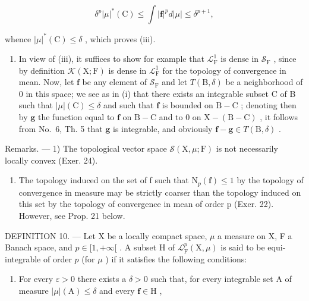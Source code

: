 \[
\delta^ {p} | \mu | ^ {*} (\mathrm{C}) \leqslant \int | \mathbf {f} | ^ {p} d | \mu | \leqslant \delta^ {p + 1},
\]

whence \(|\mu|^*(\mathrm{C}) \leqslant \delta\) , which proves (iii).

\begin{enumerate}
\def\labelenumi{(\roman{enumi})}
\setcounter{enumi}{1}
\tightlist
\item
  In view of (iii), it suffices to show for example that \(\mathcal{L}_{\mathrm{F}}^{1}\) is dense in \(\mathcal{S}_{\mathrm{F}}\) , since by definition \(\mathcal{K}(\mathrm{X};\mathrm{F})\) is dense in \(\mathcal{L}_{\mathrm{F}}^{1}\) for the topology of convergence in mean. Now, let \(\mathbf{f}\) be any element of \(\mathcal{S}_{\mathrm{F}}\) and let \(T(\mathrm{B},\delta)\) be a neighborhood of 0 in this space; we see as in (i) that there exists an integrable subset C of B such that \(|\mu|(\mathrm{C})\leqslant \delta\) and such that \(\mathbf{f}\) is bounded on \(\mathrm{B - C}\) ; denoting then by \(\mathbf{g}\) the function equal to \(\mathbf{f}\) on \(\mathrm{B - C}\) and to 0 on \(\mathrm{X - (B - C)}\) , it follows from No.~6, Th. 5 that \(\mathbf{g}\) is integrable, and obviously \(\mathbf{f} - \mathbf{g}\in T(\mathrm{B},\delta)\) .
\end{enumerate}

Remarks. --- 1) The topological vector space \(\mathcal{S}(\mathrm{X},\mu ;\mathrm{F})\) is not necessarily locally convex (Exer. 24).

\begin{enumerate}
\def\labelenumi{\arabic{enumi})}
\setcounter{enumi}{1}
\tightlist
\item
  The topology induced on the set of f such that \(\mathrm{N}_{p}(\mathbf{f}) \leqslant 1\) by the topology of convergence in measure may be strictly coarser than the topology induced on this set by the topology of convergence in mean of order p (Exer. 22). However, see Prop. 21 below.
\end{enumerate}

DEFINITION 10. --- Let X be a locally compact space, \(\mu\) a measure on X, F a Banach space, and \(p \in [1, +\infty[\) . A subset H of \(\mathcal{L}_{\mathrm{F}}^{p}(\mathrm{X}, \mu)\) is said to be equi-integrable of order \(p\) (for \(\mu\) ) if it satisfies the following conditions:

\begin{enumerate}
\def\labelenumi{(\roman{enumi})}
\tightlist
\item
  For every \(\varepsilon > 0\) there exists a \(\delta > 0\) such that, for every integrable set A of measure \(|\mu| (\mathrm{A}) \leqslant \delta\) and every \(\mathbf{f} \in \mathrm{H}\) ,
\end{enumerate}


